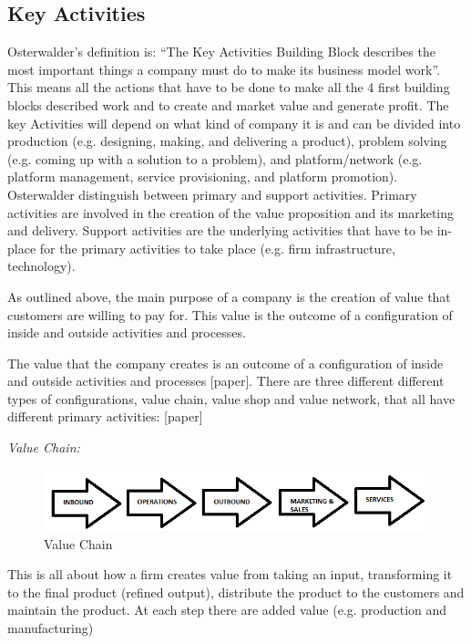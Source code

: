 \subsection{Key Activities}
Osterwalder’s definition is: “The Key Activities Building Block describes the most important things a company must do to make its business model work”. This means all the actions that have to be done to make all the 4 first building blocks described work and to create and market value and generate profit. The key Activities will depend on what kind of company it is and can be divided into production (e.g. designing, making, and delivering a product), problem solving (e.g. coming up with a solution to a problem), and platform/network (e.g. platform management, service provisioning, and platform promotion). 
Osterwalder distinguish between primary and support activities. Primary activities are involved in the creation of the value proposition and its marketing and delivery. Support activities are the underlying activities that have to be in-place for the primary activities to take place (e.g. firm infrastructure, technology).

As outlined above, the main purpose of a company is the creation of value that customers are willing to pay for. This value is the outcome of a configuration of inside and outside activities and
processes.

The value that the company creates is an outcome of a configuration of inside and outside activities and processes [paper]. There are three different different types of configurations, value chain, value shop and value network, that all have different primary activities: [paper]

\newpage

\emph{Value Chain:} 

\begin{figure}[h]
\caption[ValueChain]{Value Chain \cite{token}}
\label{fig:ValueChain}
\begin{center}
\includegraphics[scale=0.8]{valuechain}
\end{center}
\end{figure}


This is all about how a firm creates value from taking an input, transforming it to the final product (refined output), distribute the product  to the customers and maintain the product. At each step there are added value (e.g. production and manufacturing)

